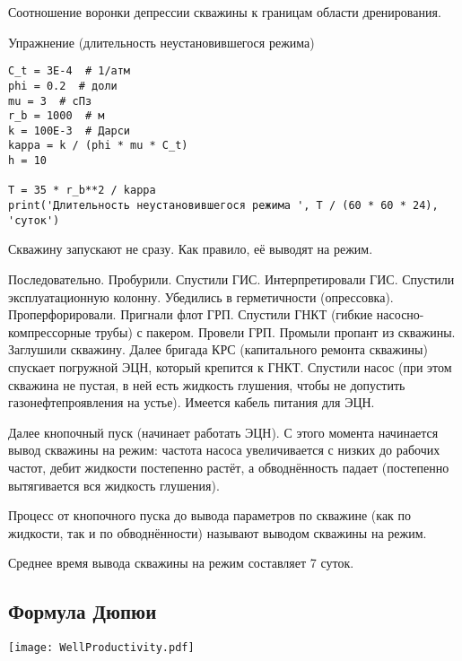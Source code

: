 \documentclass[main.tex]{subfiles}
\begin{document}




Соотношение воронки депрессии скважины к границам области дренирования.

Упражнение (длительность неустановившегося режима)

\begin{listing}[h]
\begin{verbatim}
C_t = 3E-4  # 1/атм
phi = 0.2  # доли
mu = 3  # сПз
r_b = 1000  # м
k = 100E-3  # Дарси
kappa = k / (phi * mu * C_t)
h = 10

T = 35 * r_b**2 / kappa
print('Длительность неустановившегося режима ', T / (60 * 60 * 24), 'суток')
\end{verbatim}
\end{listing}

Скважину запускают не сразу. Как правило, её выводят на режим.

Последовательно. Пробурили. Спустили ГИС. Интерпретировали ГИС. Спустили эксплуатационную колонну. Убедились в герметичности (опрессовка). Проперфорировали. Пригнали флот ГРП. Спустили ГНКТ (гибкие насосно-компрессорные трубы) с пакером. Провели ГРП. Промыли пропант из скважины. Заглушили скважину. Далее бригада КРС (капитального ремонта скважины) спускает погружной ЭЦН, который крепится к ГНКТ. Спустили насос (при этом скважина не пустая, в ней есть жидкость глушения, чтобы не допустить газонефтепроявления на устье). Имеется кабель питания для ЭЦН.

Далее кнопочный пуск (начинает работать ЭЦН). С этого момента начинается вывод скважины на режим: частота насоса увеличивается с низких до рабочих частот, дебит жидкости постепенно растёт, а обводнённость падает (постепенно вытягивается вся жидкость глушения).

Процесс от кнопочного пуска до вывода параметров по скважине (как по жидкости, так и по обводнённости) называют выводом скважины на режим.

Среднее время вывода скважины на режим составляет 7 суток.

\subsection{Формула Дюпюи}
\texttt{[image: WellProductivity.pdf]}
\end{document}
